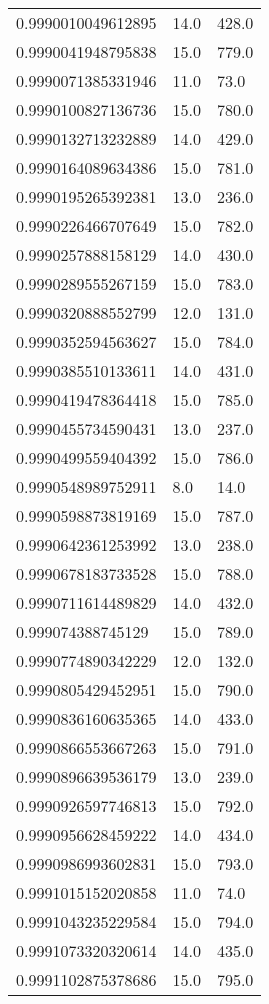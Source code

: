 \begin{center}
\begin{supertabular}[H]{p{0.30\textwidth}p{0.05\textwidth}p{0.05\textwidth}}
0.9990010049612895 & 14.0 & 428.0 \\ 
0.9990041948795838 & 15.0 & 779.0 \\ 
0.9990071385331946 & 11.0 & 73.0 \\ 
0.9990100827136736 & 15.0 & 780.0 \\ 
0.9990132713232889 & 14.0 & 429.0 \\ 
0.9990164089634386 & 15.0 & 781.0 \\ 
0.9990195265392381 & 13.0 & 236.0 \\ 
0.9990226466707649 & 15.0 & 782.0 \\ 
0.9990257888158129 & 14.0 & 430.0 \\ 
0.9990289555267159 & 15.0 & 783.0 \\ 
0.9990320888552799 & 12.0 & 131.0 \\ 
0.9990352594563627 & 15.0 & 784.0 \\ 
0.9990385510133611 & 14.0 & 431.0 \\ 
0.9990419478364418 & 15.0 & 785.0 \\ 
0.9990455734590431 & 13.0 & 237.0 \\ 
0.9990499559404392 & 15.0 & 786.0 \\ 
0.9990548989752911 & 8.0 & 14.0 \\ 
0.9990598873819169 & 15.0 & 787.0 \\ 
0.9990642361253992 & 13.0 & 238.0 \\ 
0.9990678183733528 & 15.0 & 788.0 \\ 
0.9990711614489829 & 14.0 & 432.0 \\ 
0.999074388745129 & 15.0 & 789.0 \\ 
0.9990774890342229 & 12.0 & 132.0 \\ 
0.9990805429452951 & 15.0 & 790.0 \\ 
0.9990836160635365 & 14.0 & 433.0 \\ 
0.9990866553667263 & 15.0 & 791.0 \\ 
0.9990896639536179 & 13.0 & 239.0 \\ 
0.9990926597746813 & 15.0 & 792.0 \\ 
0.9990956628459222 & 14.0 & 434.0 \\ 
0.9990986993602831 & 15.0 & 793.0 \\ 
0.9991015152020858 & 11.0 & 74.0 \\ 
0.9991043235229584 & 15.0 & 794.0 \\ 
0.9991073320320614 & 14.0 & 435.0 \\ 
0.9991102875378686 & 15.0 & 795.0 \\ 

\end{supertabular}
\end{center}
